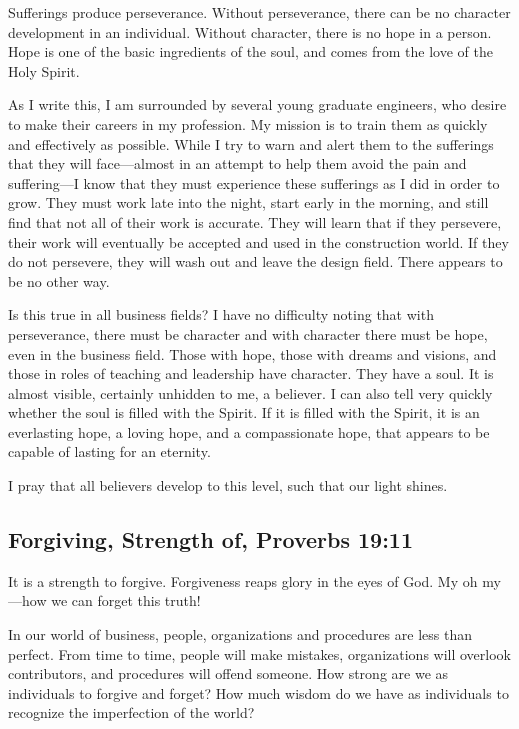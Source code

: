 \documentclass[12pt]{memoir}
\begin{document}
Sufferings produce perseverance. Without perseverance, there can
be no character development in an individual. Without character, there is no hope
in a person. Hope is one of the basic ingredients of the soul, and comes from the love of the Holy Spirit. 

As I write this, I am surrounded by several young graduate engineers,
who desire to make their careers in my profession. My mission is to
train them as quickly and effectively as possible. While I try to
warn and alert them to the sufferings that they will face---almost in an attempt to help them avoid the pain and suffering---I know that
they must experience these sufferings as I did in order to grow.
They must work late into the night, start early in the morning, and
still find that not all of their work is accurate. They will learn
that if they persevere, their work will eventually be accepted and
used in the construction world. If they do not persevere, they will
wash out and leave the design field. There appears to be no other
way.

Is this true in all business fields? I have no difficulty noting that with perseverance, there must be
character and with character there must be hope, even in the business
field. Those with hope, those with dreams and visions, and those in
roles of teaching and leadership have character. They have a soul.
It is almost visible, certainly unhidden to me, a believer. I can
also tell very quickly whether the soul is filled with the Spirit.
If it is filled with the Spirit, it is an everlasting hope, a loving
hope, and a compassionate hope, that appears to be capable of lasting
for an eternity.

I pray that all believers develop
to this level, such that our light shines.

\subsection[Forgiving, Strength of]{Forgiving, Strength of, Proverbs 19:11}
  

It is a strength to forgive. Forgiveness reaps glory in the eyes of God. My oh my---how we can forget this truth!

In our world of business, people, organizations and procedures are
less than perfect. From time to time, people will make mistakes, organizations
will overlook contributors, and procedures will offend someone. How
strong are we as individuals to forgive and forget? How much wisdom
do we have as individuals to recognize the imperfection of the world? 
\end{document}
